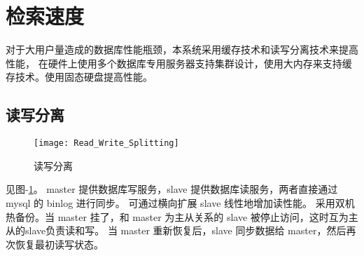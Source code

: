 {\color{red}
\section{检索速度}
对于大用户量造成的数据库性能瓶颈，本系统采用缓存技术和读写分离技术来提高性能，
在硬件上使用多个数据库专用服务器支持集群设计，使用大内存来支持缓存技术。使用固态硬盘提高性能。


\subsection{读写分离}

\begin{figure}[h]
	\centering
	\texttt{[image: Read\_Write\_Splitting]}
	\caption{读写分离} \label{fig:Read_Write_Splitting}
\end{figure}

见图-\ref{fig:Read_Write_Splitting}。
master 提供数据库写服务，slave 提供数据库读服务，两者直接通过 mysql 的 binlog 进行同步。
可通过横向扩展 slave 线性地增加读性能。
采用双机热备份。当 master 挂了，和 master 为主从关系的 slave 被停止访问，这时互为主从的slave负责读和写。
当 master 重新恢复后，slave 同步数据给 master，然后再次恢复最初读写状态。







}